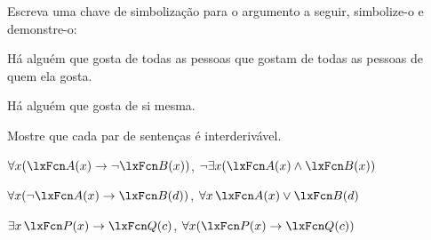 \solutions
\problempart
\label{pr.likes}
Escreva uma chave de simbolização para o argumento a seguir, simbolize-o e demonstre-o:
\begin{earg}
\item Há alguém que gosta de todas as pessoas que gostam de todas as pessoas de quem ela
gosta.
\item[\texttherefore] Há alguém que gosta de si mesma.
\end{earg}

\problempart
Mostre que cada par de sentenças é interderivável.
\begin{compactlist}
\item $\forall x (\atom{A}{x}\eif \enot \atom{B}{x})$, $\enot\exists x(\atom{A}{x} \eand \atom{B}{x})$
\item $\forall x (\enot \atom{A}{x}\eif \atom{B}{d})$, $\forall x\,\atom{A}{x} \eor \atom{B}{d}$
\item $\exists x\,\atom{P}{x} \eif \atom{Q}{c}$, $\forall x (\atom{P}{x} \eif \atom{Q}{c})$
\end{compactlist}


